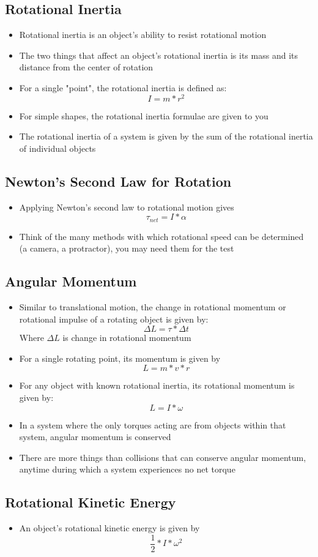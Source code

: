 \subsection{Rotational Inertia}
\begin{itemize}
    \item Rotational inertia is an object's ability to resist rotational motion
    \item The two things that affect an object's rotational inertia is its mass and its distance from the center of rotation
    \item For a single "point", the rotational inertia is defined as: \[I=m*r^2\]
    \item For simple shapes, the rotational inertia formulae are given to you
    \item The rotational inertia of a system is given by the sum of the rotational inertia of individual objects
\end{itemize}

\subsection{Newton's Second Law for Rotation}
\begin{itemize}
    \item Applying Newton's second law to rotational motion gives \[\tau_{net}=I*\alpha\]
    \item Think of the many methods with which rotational speed can be determined (a camera, a protractor), you may need them for the test
\end{itemize}

\subsection{Angular Momentum}
\begin{itemize}
    \item Similar to translational motion, the change in rotational momentum or rotational impulse of a rotating object is given by: \[\Delta L=\tau*\Delta t\] Where \(\Delta L\) is change in rotational momentum
    \item For a single rotating point, its momentum is given by \[L=m*v*r\]
    \item For any object with known rotational inertia, its rotational momentum is given by: \[L=I*\omega\]
    \item In a system where the only torques acting are from objects within that system, angular momentum is conserved
    \item There are more things than collisions that can conserve angular momentum, anytime during which a system experiences no net torque
\end{itemize}

\subsection{Rotational Kinetic Energy}
\begin{itemize}
    \item An object's rotational kinetic energy is given by \[\frac{1}{2}*I*\omega^2\]
\end{itemize}